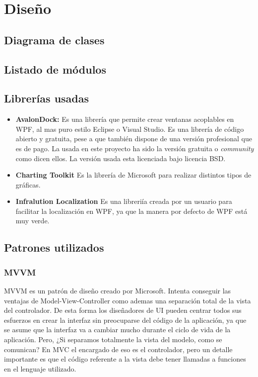 \section{Dise\~{n}o}

\subsection{Diagrama de clases}

\subsection{Listado de m\'odulos}

\subsection{Librer\'{i}as usadas}
\begin{itemize}
    \item \textbf{AvalonDock:} 
    Es una librer\'{i}a que permite crear ventanas acoplables en WPF, al mas puro estilo Eclipse o Visual Studio. Es una librer\'{i}a de
    c\'{o}digo abierto y gratuita, pese a que tambi\'{e}n dispone de una versi\'{o}n profesional que es de pago. La usada en este proyecto
    ha sido la versi\'{o}n gratuita o \emph{community} como dicen ellos. La versi\'{o}n usada esta licenciada bajo licencia BSD.
    \item \textbf{Charting Toolkit}
    Es la librer\'{i}a de Microsoft para realizar distintos tipos de gr\'{a}ficas.
    \item \textbf{Infralution Localization}
    Es una libreri\'ia creada por un usuario para facilitar la localizaci\'on en WPF, ya que la manera por defecto de WPF est\'a
    muy verde.
\end{itemize}

\subsection{Patrones utilizados}

\subsubsection{MVVM}
MVVM es un patr\'{o}n de dise\~{n}o creado por Microsoft. Intenta conseguir las ventajas de Model-View-Controller como ademas una separaci\'{o}n total
de la vista del controlador. De esta forma los dise\~{n}adores de UI pueden centrar todos sus esfuerzos en crear la interfaz sin preocuparse 
del c\'{o}digo de la aplicaci\'{o}n, ya que se asume que la interfaz va a cambiar mucho durante el ciclo de vida de la aplicaci\'{o}n. Pero,
¿Si separamos totalmente la vista del modelo, como se comunican? En MVC el encargado de eso es el controlador, pero un detalle importante es 
que el c\'{o}digo referente a la vista debe tener llamadas a funciones en el lenguaje utilizado.

